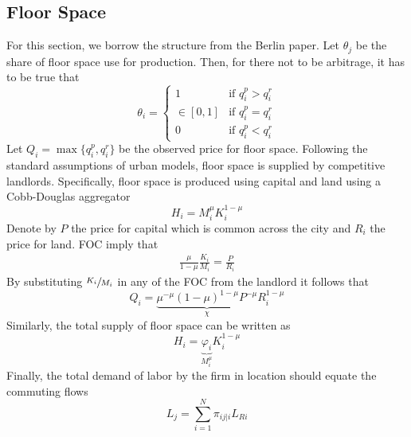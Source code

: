 \documentclass[12pt]{article}
\begin{document}
\subsection{Floor Space}
For this section, we borrow the structure from the Berlin paper. Let $\theta_j$ be the share of floor space use for production. Then, for there not to be arbitrage, it has to be true that 
\begin{equation*}
    \theta_i = \begin{cases}
    1 &\mbox{if } q_i^p>q_i^r \\ 
    \in[0,1] &\mbox{if } q_i^p=q_i^r \\
    0 &\mbox{if } q_i^p<q_i^r 
    \end{cases}
\end{equation*}
Let $Q_i=\max\{q_i^p,q_i^r\}$ be the observed price for floor space. Following the standard assumptions of urban models, floor space is supplied by competitive landlords. Specifically, floor space is produced using capital and land using a Cobb-Douglas aggregator
\begin{equation*}
    H_i = M_i^\mu K_i^{1-\mu}
\end{equation*}
Denote by $P$ the price for capital which is common across the city and $R_i$ the price for land. FOC imply that 
\begin{align*}
    \frac{\mu}{1-\mu}\frac{K_i}{M_i} = \frac{P}{R_i}
\end{align*}
By substituting $\sfrac{K_i}{M_i}$ in any of the FOC from the landlord it follows that
\begin{equation*}
    \boxed{Q_i = \underbrace{\mu^{-\mu}(1-\mu)^{1-\mu}P^{-\mu}}_{\chi}R_i^{1-\mu} }
\end{equation*}
Similarly, the total supply of floor space can be written as 
\begin{equation*}
    \boxed{H_i = \underbrace{\varphi_i}_{M_i^\mu}K_i^{1-\mu}}
\end{equation*}
Finally, the total demand of labor by the firm in location should equate the commuting flows
\begin{equation*}
    L_j = \sum_{i=1}^N \pi_{ij\vert i}L_{Ri}
\end{equation*}
\end{document}
